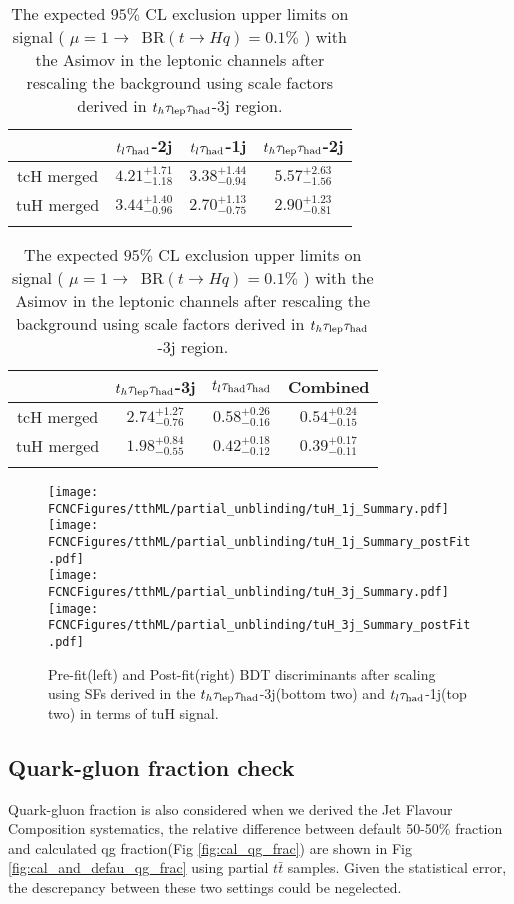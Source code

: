 \begin{table}
\centering
\begin{tabular}{cccc} \toprule\toprule
 & $t_l\tau_\text{had}$-2j & $t_l\tau_\text{had}$-1j & $t_h\tau_\text{lep}{}\tau_\text{had}$-2j\\\midrule
tcH merged & $4.21^{+1.71}_{-1.18}$ & $3.38^{+1.44}_{-0.94}$ & $5.57^{+2.63}_{-1.56}$\\
tuH merged & $3.44^{+1.40}_{-0.96}$ & $2.70^{+1.13}_{-0.75}$ & $2.90^{+1.23}_{-0.81}$\\
\bottomrule\bottomrule\\
\end{tabular}
\begin{tabular}{cccc} \toprule\toprule
 & $t_h\tau_\text{lep}{}\tau_\text{had}$-3j & $t_l\tau_\text{had}{}\tau_\text{had}$ & Combined\\\midrule
tcH merged & $2.74^{+1.27}_{-0.76}$ & $0.58^{+0.26}_{-0.16}$ & $0.54^{+0.24}_{-0.15}$\\
tuH merged & $1.98^{+0.84}_{-0.55}$ & $0.42^{+0.18}_{-0.12}$ & $0.39^{+0.17}_{-0.11}$\\
\bottomrule\bottomrule\\
\end{tabular}
\caption{The expected $95\%$ CL exclusion upper limits on signal ( $\mu=1\to$~BR$(t\to Hq)=0.1\%$ ) with the Asimov in the leptonic channels after rescaling the background using scale factors derived in $t_h\tau_\text{lep}{}\tau_\text{had}$-3j region.} 
\label{tab:tthML_rescaled_limit_3j}
\end{table}

\begin{figure}[H]
\centering
\texttt{[image: \\FCNCFigures/tthML/partial\_unblinding/tuH\_1j\_Summary.pdf]}
\texttt{[image: \\FCNCFigures/tthML/partial\_unblinding/tuH\_1j\_Summary\_postFit.pdf]}
\\
\texttt{[image: \\FCNCFigures/tthML/partial\_unblinding/tuH\_3j\_Summary.pdf]}
\texttt{[image: \\FCNCFigures/tthML/partial\_unblinding/tuH\_3j\_Summary\_postFit.pdf]}
\caption{Pre-fit(left) and Post-fit(right) BDT discriminants after scaling using SFs derived in the $t_h\tau_\text{lep}{}\tau_\text{had}$-3j(bottom two) and $t_l\tau_\text{had}$-1j(top two) in terms of tuH signal. }
\label{fig:tthML_partial_unblinding_tuH}
\end{figure}


\subsection{Quark-gluon fraction check}
Quark-gluon fraction is also considered when we derived the Jet Flavour Composition systematics, the relative difference between default 50-50\% fraction and calculated qg fraction(Fig \ref{fig:cal_qg_frac}) are shown in Fig \ref{fig:cal_and_defau_qg_frac} using partial $t\bar{t}$ samples. Given the statistical error, the descrepancy between these two settings could be negelected.



